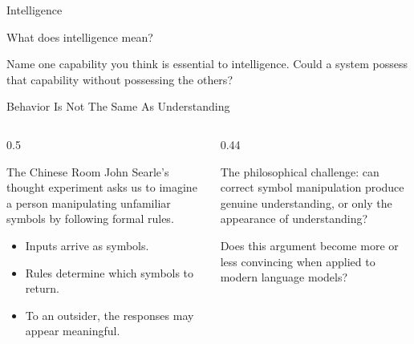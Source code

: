 \documentclass[aspectratio=169]{beamer}
\begin{document}

\begin{frame}{Intelligence}
  \begin{center}
    {\Huge What does intelligence mean?}
  \end{center}
  \vspace{0.18in}
  \begin{activity}
    Name one capability you think is essential to intelligence. Could a system possess that capability without possessing the others?
  \end{activity}
\end{frame}

\begin{frame}[shrink=4]{Behavior Is Not The Same As Understanding}
  \begin{columns}[T,onlytextwidth]
    \begin{column}{0.5\textwidth}
      \begin{block}{The Chinese Room}
        John Searle's thought experiment asks us to imagine a person manipulating unfamiliar symbols by following formal rules.
      \end{block}
      \begin{itemize}
        \item Inputs arrive as symbols.
        \item Rules determine which symbols to return.
        \item To an outsider, the responses may appear meaningful.
      \end{itemize}
    \end{column}
    \begin{column}{0.44\textwidth}
      \begin{keyidea}
        The philosophical challenge: can correct symbol manipulation produce genuine understanding, or only the appearance of understanding?
      \end{keyidea}
      \vspace{0.10in}
      \begin{activity}
        Does this argument become more or less convincing when applied to modern language models?
      \end{activity}
    \end{column}
  \end{columns}
\end{frame}
\end{document}
